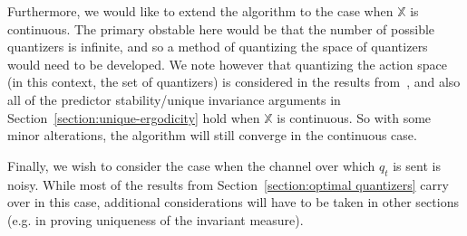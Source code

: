 \documentclass{article}
\begin{document}
Furthermore, we would like to extend the algorithm to the case when \( \mathbb{X} \) is continuous. The primary obstable here would be that the number of possible quantizers is infinite, and so a method of quantizing the space of quantizers would need to be developed. We note however that quantizing the action space (in this context, the set of quantizers) is considered in the results from~\cite{Kara}, and also all of the predictor stability/unique invariance arguments in Section~\ref{section:unique-ergodicity} hold when \( \mathbb{X} \) is continuous. So with some minor alterations, the algorithm will still converge in the continuous case.

Finally, we wish to consider the case when the channel over which \(q_t\) is sent is noisy. While most of the results from Section~\ref{section:optimal quantizers} carry over in this case, additional considerations will have to be taken in other sections (e.g. in proving uniqueness of the invariant measure).

\newpage
\printbibliography
\end{document}
